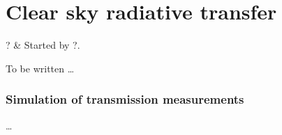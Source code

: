 \chapter{Clear sky radiative transfer}
 \label{sec:rte}


\starthistory
  ? & Started by ?. \\
\stophistory


To be written \dots


\subsection{Simulation of transmission measurements}
\label{sec:rte:trans_sim}

\dots


